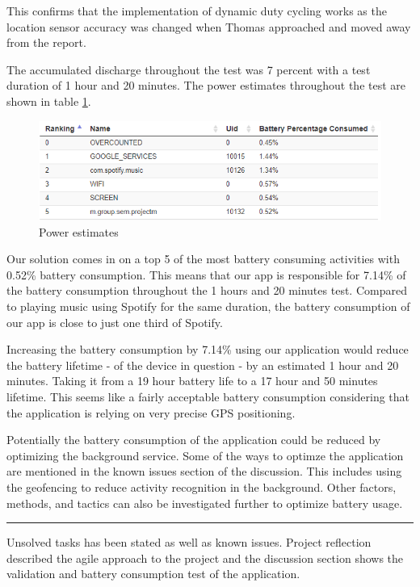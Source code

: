 This confirms that the implementation of dynamic duty cycling works as the location sensor accuracy was changed when Thomas approached and moved away from the report. 

The accumulated discharge throughout the test was 7 percent with a test duration of 1 hour and 20 minutes. The power estimates throughout the test are shown in table \ref{fig:power_estimates}.


\begin{figure}[H]
\centering
\includegraphics[width=\linewidth]{images/powerestimates}
\caption{Power estimates} 
\label{fig:power_estimates}
\end{figure}

Our solution comes in on a top 5 of the most battery consuming activities with 0.52\% battery consumption. This means that our app is responsible for 7.14\% of the battery consumption throughout the 1 hours and 20 minutes test. Compared to playing music using Spotify for the same duration, the battery consumption of our app is close to just one third of Spotify. 

Increasing the battery consumption by 7.14\% using our application would reduce the battery lifetime - of the device in question - by an estimated 1 hour and 20 minutes. Taking it from a 19 hour battery life to a 17 hour and 50 minutes lifetime. This seems like a fairly acceptable battery consumption considering that the application is relying on very precise GPS positioning. 

Potentially the battery consumption of the application could be reduced by optimizing the background service. Some of the ways to optimze the application are mentioned in the known issues section of the discussion. This includes using the geofencing to reduce activity recognition in the background. Other factors, methods, and tactics can also be investigated further to optimize battery usage.


\vspace{3em}
\hrule
Unsolved tasks has been stated as well as known issues. Project reflection described the agile approach to the project and the discussion section shows the validation and battery consumption test of the application. 